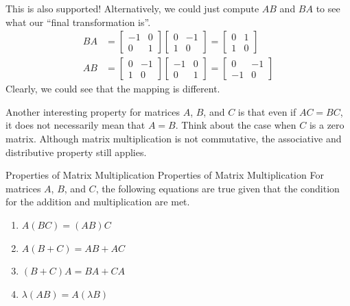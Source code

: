 \documentclass[../main.tex]{subfiles}
\begin{document}
This is also supported! Alternatively, we could just compute
$AB$ and $BA$ to see what our ``final transformation is''.
\begin{align*}
    BA &=
    \begin{bmatrix}
        -1 & 0 \\
        0  & 1
    \end{bmatrix}
    \begin{bmatrix}
        0 & -1 \\
        1 & 0
    \end{bmatrix}
    =
    \begin{bmatrix}
        0 & 1 \\
        1 & 0
    \end{bmatrix} \\
    AB &=
    \begin{bmatrix}
        0 & -1 \\
        1 & 0
    \end{bmatrix}
    \begin{bmatrix}
        -1 & 0 \\
        0  & 1
    \end{bmatrix}
    =
    \begin{bmatrix}
        0  & -1 \\
        -1 & 0
    \end{bmatrix}
\end{align*}
Clearly, we could see that the mapping is different.

Another interesting property for matrices $A$, $B$, and $C$ is that
even if $AC = BC$, it does not necessarily mean that $A = B$.
Think about the case when $C$ is a zero matrix. Although matrix
multiplication is not commutative, the associative and distributive
property still applies.

\begin{theorem}{Properties of Matrix Multiplication}
{Properties of Matrix Multiplication}
For matrices $A$, $B$, and $C$, the following equations are true
given that the condition for the addition and multiplication are met.
\begin{enumerate}
\item $A(BC) = (AB)C$
\item $A(B + C) = AB + AC$
\item $(B + C)A = BA + CA$
\item $\lambda(AB) = A(\lambda B)$
\end{enumerate}
\end{theorem}
\end{document}
